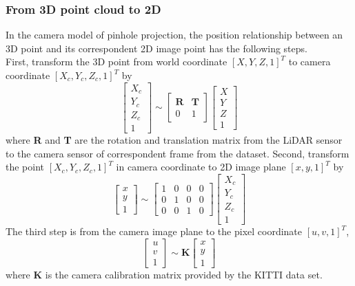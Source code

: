 \documentclass[letterpaper, 10 pt, conference]{ieeeconf}
\begin{document}
\subsubsection{From 3D point cloud to 2D}
In the camera model of pinhole projection, the position relationship between an 3D point and its correspondent 2D image point has the following steps.\\ 
First, transform the 3D point from world coordinate $[X, Y, Z, 1]^T$ to camera coordinate $[X_c, Y_c, Z_c, 1]^T$ by 
$$
\begin{bmatrix} 
X_c \\
Y_c \\
Z_c \\
1
\end{bmatrix}
\sim
\begin{bmatrix} 
\textbf{R} & \textbf{T} \\
0 & 1 
\end{bmatrix}
\begin{bmatrix} 
X \\
Y \\
Z \\
1
\end{bmatrix}
$$
where \textbf{R} and \textbf{T} are the rotation and translation matrix from the LiDAR sensor to the camera sensor of correspondent frame from the dataset.
Second, transform the point $[X_c, Y_c, Z_c, 1]^T$ in camera coordinate to 2D image plane $[x, y, 1]^T$ by
$$
\begin{bmatrix} 
x \\
y \\
1
\end{bmatrix}
\sim
\begin{bmatrix} 
1 & 0 & 0 & 0 \\
0 & 1 & 0 & 0 \\
0 & 0 & 1 & 0
\end{bmatrix}
\begin{bmatrix} 
X_c \\
Y_c \\
Z_c \\
1
\end{bmatrix}
$$
The third step is from the camera image plane to the pixel coordinate $[u, v, 1]^T$,
$$
\begin{bmatrix} 
u \\
v \\
1
\end{bmatrix}
\sim
\textbf{K}
\begin{bmatrix} 
x \\
y \\
1
\end{bmatrix}
$$
where \textbf{K} is the camera calibration matrix provided by the KITTI data set.\\
\end{document}
